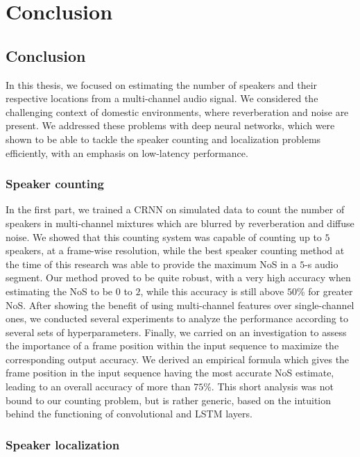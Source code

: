 \chapter{Conclusion}
\label{chap:conclusion}

\section{Conclusion}

In this thesis, we focused on estimating the number of speakers and their respective locations from a multi-channel audio signal. We considered the challenging context of domestic environments, where reverberation and noise are present. We addressed these problems with deep neural networks, which were shown to be able to tackle the speaker counting and localization problems efficiently, with an emphasis on low-latency performance.

\subsection{Speaker counting}

In the first part, we trained a CRNN on simulated data to count the number of speakers in multi-channel mixtures which are blurred by reverberation and diffuse noise. We showed that this counting system was capable of counting up to $5$ speakers, at a frame-wise resolution, while the best speaker counting method at the time of this research was able to provide the maximum NoS in a $5$-s audio segment. Our method proved to be quite robust, with a very high accuracy when estimating the NoS to be $0$ to $2$, while this accuracy is still above $50$\% for greater NoS. After showing the benefit of using multi-channel features over single-channel ones, we conducted several experiments to analyze the performance according to several sets of hyperparameters. Finally, we carried on an investigation to assess the importance of a frame position within the input sequence to maximize the corresponding output accuracy. We derived an empirical formula which gives the frame position in the input sequence having the most accurate NoS estimate, leading to an overall accuracy of more than $75$\%. This short analysis was not bound to our counting problem, but is rather generic, based on the intuition behind the functioning of convolutional and LSTM layers.

\subsection{Speaker localization}

